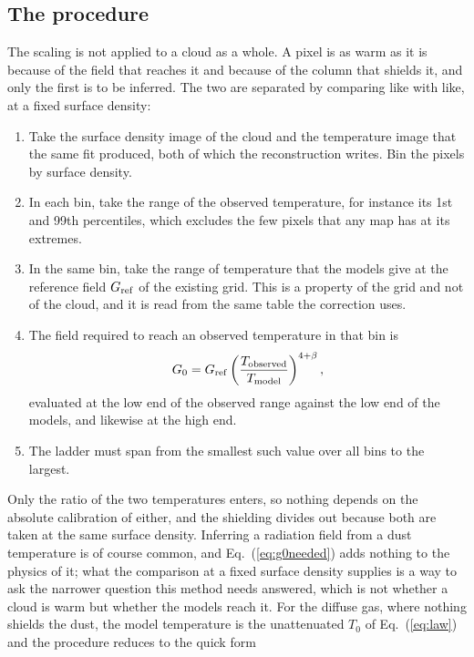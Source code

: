 \subsection{The procedure}
\label{app:field:procedure}

The scaling is not applied to a cloud as a whole.  A pixel is as warm as it is because of the field that reaches it and because of
the column that shields it, and only the first is to be inferred.  The two are separated by comparing like with like, at a fixed
surface density:

\begin{enumerate}
\item Take the surface density image of the cloud and the temperature image that the same fit produced, both of which the
      reconstruction writes.  Bin the pixels by surface density.
\item In each bin, take the range of the observed temperature, for instance its 1st and 99th percentiles, which excludes the few
      pixels that any map has at its extremes.
\item In the same bin, take the range of temperature that the models give at the reference field $G_{\rm ref}$ of the existing
      grid.  This is a property of the grid and not of the cloud, and it is read from the same table the correction uses.
\item The field required to reach an observed temperature in that bin is
      \begin{equation}
         G_0 = G_{\rm ref} \left( \frac{T_{\rm observed}}{T_{\rm model}} \right)^{4+\beta} ,
      \label{eq:g0needed}
      \end{equation}
      evaluated at the low end of the observed range against the low end of the models, and likewise at the high end.
\item The ladder must span from the smallest such value over all bins to the largest.
\end{enumerate}

Only the ratio of the two temperatures enters, so nothing depends on the absolute calibration of either, and the shielding
divides out because both are taken at the same surface density.  Inferring a radiation field from a dust temperature is of course
common, and Eq.~(\ref{eq:g0needed}) adds nothing to the physics of it; what the comparison at a fixed surface density supplies is
a way to ask the narrower question this method needs answered, which is not whether a cloud is warm but whether the models reach
it.  For the diffuse gas, where nothing shields the dust, the model
temperature is the unattenuated $T_0$ of Eq.~(\ref{eq:law}) and the procedure reduces to the quick form

